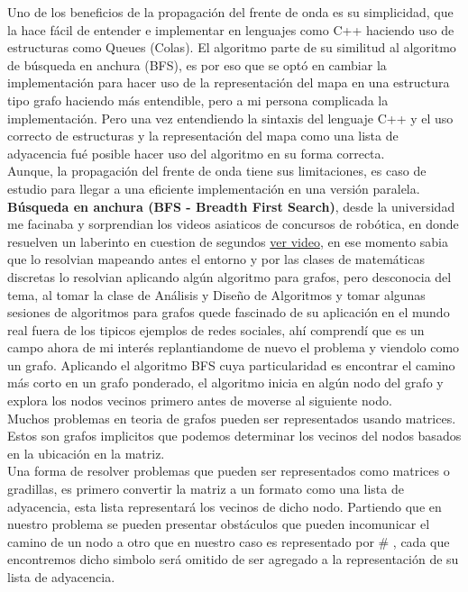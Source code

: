 \documentclass[oneside,twocolumn]{article}
\begin{document}
Uno de los beneficios de la propagación del frente de onda es su simplicidad, que la hace fácil de entender e implementar en lenguajes como C++ haciendo uso de estructuras como Queues (Colas). El algoritmo parte de su similitud al algoritmo de búsqueda en anchura (BFS), es por eso que se optó en cambiar la implementación para hacer uso de la representación del mapa en una estructura tipo grafo haciendo más entendible, pero a mi persona complicada la implementación. Pero una vez entendiendo la sintaxis del lenguaje C++ y el uso correcto de estructuras y la representación del mapa como una lista de adyacencia fué posible hacer uso del algoritmo en su forma correcta.\\

Aunque, la propagación del frente de onda tiene sus limitaciones, es caso de estudio para llegar a una eficiente implementación en una versión paralela.\\

\textbf{Búsqueda en anchura (BFS - Breadth First Search)}, desde la universidad me facinaba y sorprendian los videos asiaticos de concursos de robótica, en donde resuelven un laberinto en cuestion de segundos \href{https://www.youtube.com/watch?v=kMOssi5IcP0}{ver video}, en ese momento sabia que lo resolvian mapeando antes el entorno y por las clases de matemáticas discretas lo resolvian aplicando algún algoritmo para grafos, pero desconocia del tema, al tomar la clase de Análisis y Diseño de Algoritmos y tomar algunas sesiones de algoritmos para grafos quede fascinado de su aplicación en el mundo real fuera de los tipicos ejemplos de redes sociales, ahí comprendí que es un campo ahora de mi interés replantiandome de nuevo el problema y viendolo como un grafo. Aplicando el algoritmo BFS cuya particularidad es encontrar el camino más corto en un grafo ponderado, el algoritmo inicia en algún nodo del grafo y explora los nodos vecinos primero antes de moverse al siguiente nodo.\\

Muchos problemas en teoria de grafos pueden ser representados usando matrices. Estos son grafos implicitos que podemos determinar los vecinos del nodos basados en la ubicación en la matriz.\\

Una forma de resolver problemas que pueden ser representados como matrices o gradillas, es primero convertir la matriz a un formato como una lista de adyacencia, esta lista representará los vecinos de dicho nodo. Partiendo que en nuestro problema se pueden presentar obstáculos que pueden incomunicar el camino de un nodo a otro que en nuestro caso es representado por \# , cada que encontremos dicho simbolo será omitido de ser agregado a la representación de su lista de adyacencia.\\
\end{document}
